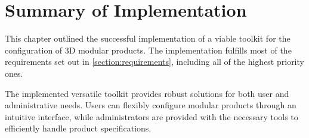 \section{Summary of Implementation} \label{section:requirmenets-evaulation}

This chapter outlined the successful implementation of a viable toolkit for the configuration of 3D modular products. The implementation fulfills most of the requirements set out in \autoref{section:requirements}, including all of the highest priority ones.

The implemented versatile toolkit provides robust solutions for both user and administrative needs. Users can flexibly configure modular products through an intuitive interface, while administrators are provided with the necessary tools to efficiently handle product specifications.


